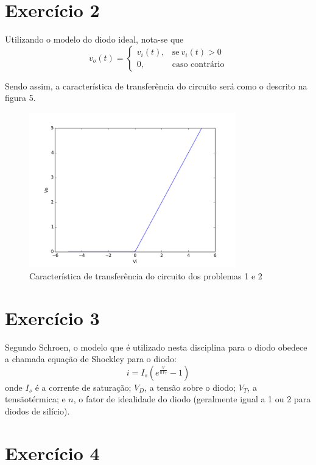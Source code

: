 \documentclass[12pt, a4paper, twoside]{article}
\begin{document}
\section{Exercício 2}

Utilizando o modelo do diodo ideal, nota-se que
\begin{equation}
    v_o(t) =
    \begin{cases}
        v_i(t), & \text{se}\ v_i(t) > 0 \\
        0, & \text{caso contrário}
    \end{cases}
\end{equation}

Sendo assim, a característica de transferência do circuito será como o descrito na
figura 5.

\begin{figure}
    \centering
    \includegraphics[width=0.8\textwidth]{figs/rel3/ex2.png}
    \caption{Característica de transferência do circuito dos problemas 1 e 2}
\end{figure}

\section{Exercício 3}

Segundo Schroen, o modelo que é utilizado nesta disciplina para o diodo obedece a
chamada equação de Shockley para o diodo:
$$i = I_s\left( e^{\frac{V}{nV_T}} - 1 \right)$$
onde $I_s$ é a corrente de saturação;
$V_D$, a tensão sobre o diodo;
$V_T$, a tensãotérmica; e
$n$, o fator de idealidade do diodo (geralmente igual a 1 ou 2 para diodos
de silício).

\section{Exercício 4}
\end{document}
